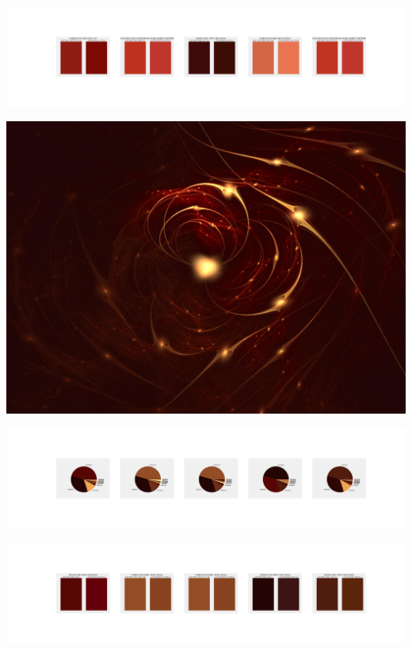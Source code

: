 \documentclass[11pt]{article}
\begin{document}
\begin{landscape}
    \begin{center}
    \includegraphics[width=250mm]{./nbimg/peak-47.jpg}
    \end{center}
    

    \begin{center}
    \includegraphics[width=\textwidth]{./nbimg/file (142).jpg}
    \end{center}

    \begin{center}
    \includegraphics[width=250mm]{./nbimg/pie-48.jpg}
    \end{center}

    \begin{center}
    \includegraphics[width=250mm]{./nbimg/peak-48.jpg}
    \end{center}
    


\end{landscape}
\end{document}
